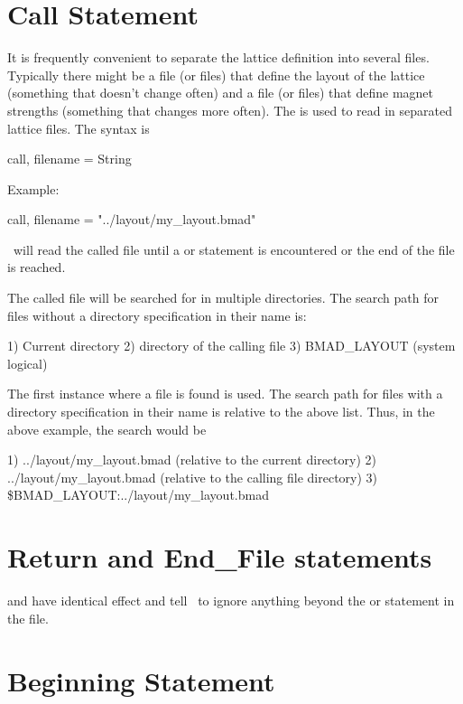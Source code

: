 \section{Call Statement}

It is frequently convenient to separate the lattice definition into
several files.  Typically there might be a file (or files) that define
the layout of the lattice (something that doesn't change often) and a
file (or files) that define magnet strengths (something that changes
more often).  The  is used to read in separated lattice
files. The syntax is
\begin{example}
  call, filename = String
\end{example}
Example:
\begin{example}
  call, filename = "../layout/my_layout.bmad"
\end{example}
\bmad\ will read the called file until a  or 
statement is encountered or the end of the file is reached.

The called file will be searched for in multiple directories.
The search path for files without a directory specification in their name is:
\begin{example}
	1) Current directory
	2) directory of the calling file
	3) BMAD_LAYOUT (system logical)
\end{example}
The first instance where a file is found is used.
The search path for files with a directory specification in their name
is relative to the above list. Thus, in the above example, the search
would be
\begin{example}
  1) ../layout/my_layout.bmad  (relative to the current directory)
  2) ../layout/my_layout.bmad  (relative to the calling file directory)
  3) \$BMAD_LAYOUT:../layout/my_layout.bmad 
\end{example}

\section{Return and End\_File statements}

 and  have identical effect and tell \bmad\ to
ignore anything beyond the  or  statement in
the file.

\section{Beginning Statement}

